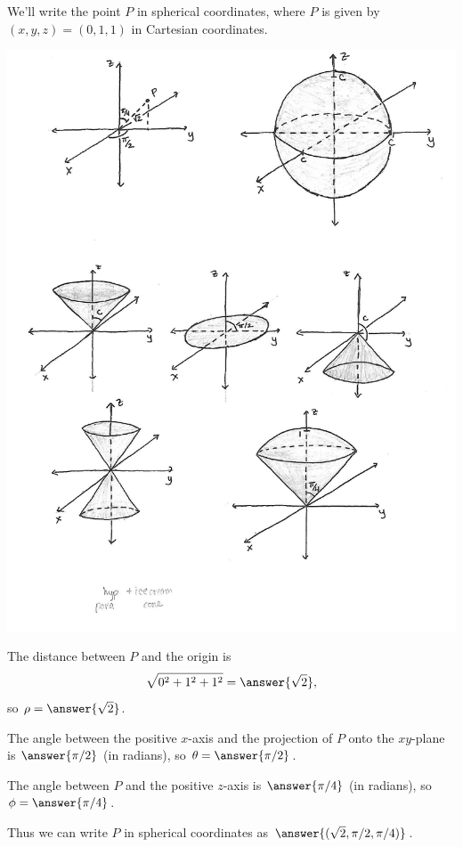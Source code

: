 \documentclass{ximera}
\begin{document}
\begin{example}
We'll write the point $P$ in spherical coordinates, where $P$ is given by $(x,y,z) = (0,1,1)$ in Cartesian coordinates.

\begin{image}
\includegraphics{011}
\end{image}

The distance between $P$ and the origin is
\[
\sqrt{0^2 + 1^2 + 1^2} = \answer{\sqrt{2}},
\]
so $\rho = \answer{\sqrt{2}}$.

The angle between the positive $x$-axis and the projection of $P$ onto the $xy$-plane is $\answer{\pi/2}$ (in radians), so $\theta = \answer{\pi/2}$.

The angle between $P$ and the positive $z$-axis is $\answer{\pi/4}$ (in radians), so $\phi = \answer{\pi/4}$.

Thus we can write $P$ in spherical coordinates as $\answer{(\sqrt{2}, \pi/2,\pi/4)}$.

\end{example}
\end{document}
